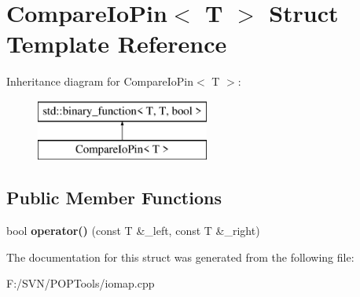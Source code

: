 \hypertarget{struct_compare_io_pin}{\section{Compare\-Io\-Pin$<$ T $>$ Struct Template Reference}
\label{struct_compare_io_pin}
}
Inheritance diagram for Compare\-Io\-Pin$<$ T $>$\-:\begin{figure}[H]
\begin{center}
\leavevmode
\includegraphics[height=2.000000cm]{struct_compare_io_pin}
\end{center}
\end{figure}
\subsection*{Public Member Functions}
\begin{DoxyCompactItemize}
\item 
\hypertarget{struct_compare_io_pin_a5a30503917f54843346f3b3916585384}{bool {\bfseries operator()} (const T \&\-\_\-left, const T \&\-\_\-right)}\label{struct_compare_io_pin_a5a30503917f54843346f3b3916585384}

\end{DoxyCompactItemize}


The documentation for this struct was generated from the following file\-:\begin{DoxyCompactItemize}
\item 
F\-:/\-S\-V\-N/\-P\-O\-P\-Tools/iomap.\-cpp\end{DoxyCompactItemize}
